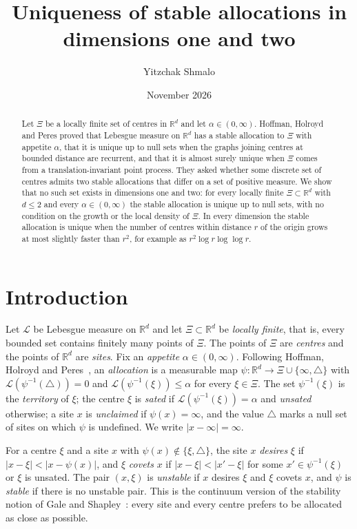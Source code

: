 \documentclass[11pt]{amsart}
\title[Stable allocations in dimensions one and two]{Uniqueness of stable allocations in dimensions one and two}
\author{Yitzchak Shmalo}
\date{November 2026}
\theoremstyle{remark}
\numberwithin{equation}{section}
\newcommand{\R}{\mathbb{R}}
\newcommand{\Leb}{\mathcal{L}}
\newcommand{\nodef}{\triangle}
\begin{document}
\begin{abstract}
Let $\Xi$ be a locally finite set of centres in $\R^d$ and let $\alpha\in(0,\infty)$. Hoffman, Holroyd and Peres proved that Lebesgue measure on $\R^d$ has a stable allocation to $\Xi$ with appetite $\alpha$, that it is unique up to null sets when the graphs joining centres at bounded distance are recurrent, and that it is almost surely unique when $\Xi$ comes from a translation-invariant point process. They asked whether some discrete set of centres admits two stable allocations that differ on a set of positive measure. We show that no such set exists in dimensions one and two: for every locally finite $\Xi\subset\R^d$ with $d\le 2$ and every $\alpha\in(0,\infty)$ the stable allocation is unique up to null sets, with no condition on the growth or the local density of $\Xi$. In every dimension the stable allocation is unique when the number of centres within distance $r$ of the origin grows at most slightly faster than $r^2$, for example as $r^2\log r\log\log r$.
\end{abstract}

\maketitle

\section{Introduction}\label{sec:intro}

Let $\Leb$ be Lebesgue measure on $\R^d$ and let $\Xi\subset\R^d$ be \emph{locally finite}, that is, every bounded set contains finitely many points of $\Xi$. The points of $\Xi$ are \emph{centres} and the points of $\R^d$ are \emph{sites}. Fix an \emph{appetite} $\alpha\in(0,\infty)$. Following Hoffman, Holroyd and Peres~\cite{HHP}, an \emph{allocation} is a measurable map $\psi\colon\R^d\to\Xi\cup\{\infty,\nodef\}$ with $\Leb(\psi^{-1}(\nodef))=0$ and $\Leb(\psi^{-1}(\xi))\le\alpha$ for every $\xi\in\Xi$. The set $\psi^{-1}(\xi)$ is the \emph{territory} of $\xi$; the centre $\xi$ is \emph{sated} if $\Leb(\psi^{-1}(\xi))=\alpha$ and \emph{unsated} otherwise; a site $x$ is \emph{unclaimed} if $\psi(x)=\infty$, and the value $\nodef$ marks a null set of sites on which $\psi$ is undefined. We write $|x-\infty|=\infty$.

For a centre $\xi$ and a site $x$ with $\psi(x)\notin\{\xi,\nodef\}$, the site $x$ \emph{desires} $\xi$ if $|x-\xi|<|x-\psi(x)|$, and $\xi$ \emph{covets} $x$ if $|x-\xi|<|x'-\xi|$ for some $x'\in\psi^{-1}(\xi)$ or $\xi$ is unsated. The pair $(x,\xi)$ is \emph{unstable} if $x$ desires $\xi$ and $\xi$ covets $x$, and $\psi$ is \emph{stable} if there is no unstable pair. This is the continuum version of the stability notion of Gale and Shapley~\cite{GS}: every site and every centre prefers to be allocated as close as possible.
\end{document}
